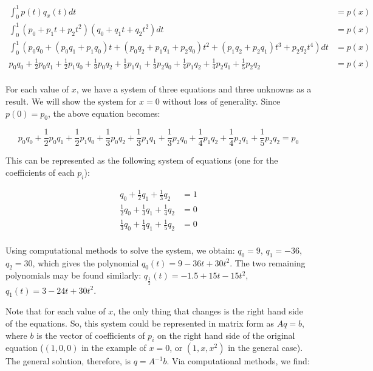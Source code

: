 \documentclass[fleqn]{homework}
\begin{document}
\begin{problem}{4}
\begin{enumerate}[(a)]
      \begin{align*}
        \int_0^1 p(t)q_x(t) dt &= p(x) \\
        \int_0^1 (p_0 + p_1t + p_2t^2)(q_0 + q_1t + q_2t^2)dt &= p(x) \\
        \int_0^1 (p_0q_0 + (p_0q_1 + p_1q_0)t + (p_0q_2 + p_1q_1 + p_2q_0)t^2 + (p_1q_2 + p_2q_1)t^3 + p_2q_2t^4)dt &= p(x) \\
        p_0q_0 + \frac{1}{2}p_0q_1 + \frac{1}{2}p_1q_0 + \frac{1}{3}p_0q_2 + \frac{1}{3}p_1q_1 + \frac{1}{3}p_2q_0 + \frac{1}{4}p_1q_2 + \frac{1}{4}p_2q_1 + \frac{1}{5}p_2q_2 &= p(x) \\
      \end{align*}

      For each value of $x$, we have a system of three equations and three
      unknowns as a result.  We will show the system for $x=0$ without loss of
      generality.  Since $p(0) = p_0$, the above equation becomes:

      \begin{equation*}
        p_0q_0 + \frac{1}{2}p_0q_1 + \frac{1}{2}p_1q_0 + \frac{1}{3}p_0q_2 + \frac{1}{3}p_1q_1 + \frac{1}{3}p_2q_0 + \frac{1}{4}p_1q_2 + \frac{1}{4}p_2q_1 + \frac{1}{5}p_2q_2 = p_0
      \end{equation*}

      This can be represented as the following system of equations (one for the
      coefficients of each $p_i$):

      \begin{align*}
        q_0 + \frac{1}{2} q_1 + \frac{1}{3} q_2 &= 1 \\
        \frac{1}{2}q_0 + \frac{1}{3}q_1 + \frac{1}{4}q_2 &= 0 \\
        \frac{1}{3}q_0 + \frac{1}{4}q_1 + \frac{1}{5}q_2 &= 0 \\
      \end{align*}

      Using computational methods to solve the system, we obtain: $q_0 = 9$,
      $q_1 = -36$, $q_2 = 30$, which gives the polynomial
      $q_0(t) = 9 - 36t + 30t^2$.  The two remaining polynomials may be found
      similarly: $q_{\frac{1}{2}}(t) = -1.5 + 15 t - 15 t^2$,
      $q_1(t) = 3 - 24t + 30t^2$.

      Note that for each value of $x$, the only thing that changes is the right
      hand side of the equations.  So, this system could be represented in
      matrix form as $Aq = b$, where $b$ is the vector of coefficients of $p_i$
      on the right hand side of the original equation ($(1, 0, 0)$ in the
      example of $x=0$, or $(1, x, x^2)$ in the general case).  The general
      solution, therefore, is $q = A^{-1}b$.  Via computational methods, we
      find:


\end{enumerate}
\end{problem}
\end{document}
